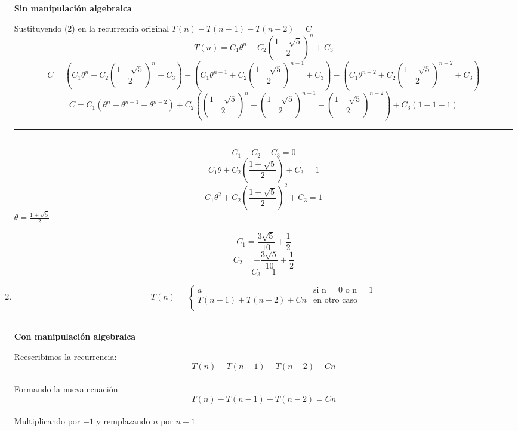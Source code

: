 \documentclass{article}
\theoremstyle{definition}
\theoremstyle{remark}
\begin{document}
\begin{enumerate}[1.]
\begin{center}
\textbf{Sin manipulaci\'on algebraica}\\
\end{center}

Sustituyendo (2) en la recurrencia original $T(n)-T(n-1)-T(n-2)=C$\\
$$T(n)=C_{1}\theta^{n} + C_{2}(\frac{1-\sqrt{5}}{2})^{n} + C_{3}$$
$$C=(C_{1}\theta^{n} + C_{2}(\frac{1-\sqrt{5}}{2})^{n} + C_{3})-(C_{1}\theta^{n-1} + C_{2}(\frac{1-\sqrt{5}}{2})^{n-1} + C_{3})-(C_{1}\theta^{n-2} + C_{2}(\frac{1-\sqrt{5}}{2})^{n-2} + C_{3})$$
$$C=C_{1}(\theta^{n}-\theta^{n-1}-\theta^{n-2})+C_{2}((\frac{1-\sqrt{5}}{2})^{n}-(\frac{1-\sqrt{5}}{2})^{n-1}-(\frac{1-\sqrt{5}}{2})^{n-2})+C_{3}(1-1-1)$$
\rule{130mm}{0.1mm}\\
$$C_{1}+C_{2}+C_{3}=0$$
$$C_{1}\theta + C_{2}(\frac{1-\sqrt{5}}{2}) + C_{3}=1$$
$$C_{1}\theta^{2} + C_{2}(\frac{1-\sqrt{5}}{2})^{2} + C_{3}=1$$
 $\theta=\frac{1+\sqrt{5}}{2}$
 
$$C_{1}=\frac{3\sqrt{5}}{10}+\frac{1}{2}$$
$$C_{2}=-\frac{3\sqrt{5}}{10}+\frac{1}{2}$$
$$C_{3} = 1 $$
\clearpage

\item  $$T(n)= \left \{ 
\begin{matrix} 
a & \mbox{si n = }0\mbox{ o n = 1}\\ 
T(n-1)+T(n-2)+Cn & \mbox{en}\mbox{ otro caso}\\
\end{matrix}
\right. $$\\

\begin{center}
\textbf{Con manipulaci\'on algebraica}\\
\end{center}

Reescribimos la recurrencia: \\
$$ T(n)-T(n-1)-T(n-2)-Cn $$\\
Formando la nueva ecuaci\'on
$$ T(n)-T(n-1)-T(n-2)=Cn $$\\
Multiplicando por $-1$ y remplazando $n$ por $n-1$\\


\end{enumerate}
\end{document}
